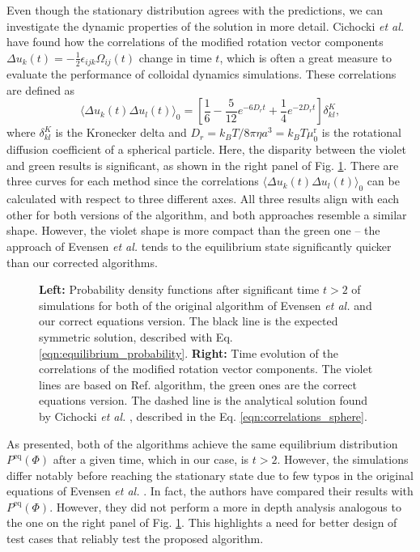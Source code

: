 \documentclass{master_thesis}
\begin{document}
Even though the stationary distribution agrees with the predictions, we can investigate the dynamic properties of the solution in more detail. Cichocki \textit{et al.} \cite{cichocki2015} have found how the correlations of the modified rotation vector components $\Delta u_k(t) = - \frac{1}{2} \epsilon_{ijk} \Omega_{ij}(t)$ change in time $t$, which is often a great measure to evaluate the performance of colloidal dynamics simulations. These correlations are defined as
\begin{equation}
    \langle \Delta u_k (t) \Delta u_l (t) \rangle_0 = \left[
    \frac{1}{6} - \frac{5}{12}e^{-6D_r t} + \frac{1}{4}e^{-2D_r t}
    \right] \delta^{K}_{kl},
    \label{eqn:correlations_sphere}
\end{equation}
where $\delta^{K}_{kl}$ is the Kronecker delta and $D_r=k_BT/8\pi\eta a^3=k_BT\mu_0^{\textrm{r}}$ is the rotational diffusion coefficient of a spherical particle. Here, the disparity between the violet and green results is significant, as shown in the right panel of Fig. \ref{fig:unbounded_sphere}. There are three curves for each method since the correlations $\langle \Delta u_k (t) \Delta u_l (t) \rangle_0$ can be calculated with respect to three different axes. All three results align with each other for both versions of the algorithm, and both approaches resemble a similar shape. However, the violet shape is more compact than the green one -- the approach of Evensen \textit{et al.} \cite{evensen2008} tends to the equilibrium state significantly quicker than our corrected algorithms.

\begin{figure}
    \centering
    
    \caption{\textbf{Left:} Probability density functions after significant time $t>2$ of simulations for both of the original algorithm of Evensen \textit{et al.} \cite{evensen2008} and our correct equations version. The black line is the expected symmetric solution, described with Eq. \eqref{eqn:equilibrium_probability}. \textbf{Right:} Time evolution of the correlations of the modified rotation vector components. The violet lines are based on Ref. \cite{evensen2008} algorithm, the green ones are the correct equations version. The dashed line is the analytical solution found by Cichocki \textit{et al.} \cite{cichocki2015}, described in the Eq. \eqref{eqn:correlations_sphere}.}
    \label{fig:unbounded_sphere}
\end{figure}

As presented, both of the algorithms achieve the same equilibrium distribution $P^{\textrm{eq}}(\Phi)$ after a given time, which in our case, is $t>2$. However, the simulations differ notably before reaching the stationary state due to few typos in the original equations of Evensen \textit{et al.} \cite{evensen2008}. In fact, the authors have compared their results with $P^{\textrm{eq}}(\Phi)$. However, they did not perform a more in depth analysis analogous to the one on the right panel of Fig. \ref{fig:unbounded_sphere}. This highlights a need for better design of test cases that reliably test the proposed algorithm.
\end{document}

